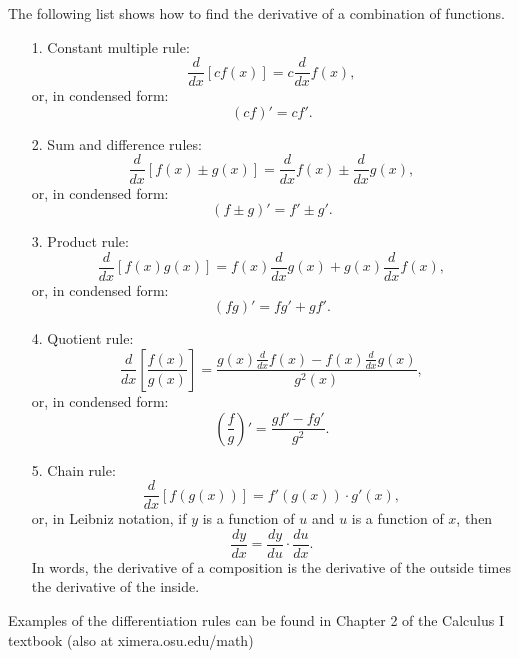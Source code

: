 \documentclass[handout]{ximera}
\begin{document}
The following list shows how to find the derivative of a combination of functions.

\begin{enumerate}

\item[1.] Constant multiple rule:
\[
\frac{d}{dx} \left[cf(x)\right] = c \frac{d}{dx} f(x),
\]
or, in condensed form:
\[
(cf)' = cf'.
\]

\item[2.] Sum and difference rules:
\[
\frac{d}{dx} \left[f(x) \pm g(x)\right] = \frac{d}{dx} f(x) \pm \frac{d}{dx} g(x),
\]
or, in condensed form:
\[
(f \pm g)' = f' \pm g'.
\]

\item[3.] Product rule:
\[
\frac{d}{dx} \left[f(x)g(x)\right] = f(x) \frac{d}{dx} g(x) + g(x) \frac{d}{dx} f(x),
\]
or, in condensed form:
\[
(fg)' = fg' + gf'.
\]

\item[4.] Quotient rule:
\[
\frac{d}{dx} \left[\frac{f(x)}{g(x)}\right] = \frac{g(x) \frac{d}{dx} f(x) - f(x) \frac{d}{dx} g(x)}{g^2(x)},
\]
or, in condensed form:
\[
\left(\frac{f}{g}\right)' =  \frac{gf' - fg'}{g^2}.
\]

\item[5.] Chain rule:
\[
\frac{d}{dx} \left[f(g(x))\right] = f'(g(x)) \cdot g'(x),
\]
or, in Leibniz notation, if $y$ is a function of $u$ and $u$ is a function of $x$, then
\[
\frac{dy}{dx} = \frac{dy}{du} \cdot \frac{du}{dx}.
\]
In words, the derivative of a composition is the derivative of the outside times the derivative of the inside.

\end{enumerate}

Examples of the differentiation rules can be found in Chapter 2 of the 
Calculus I textbook (also at ximera.osu.edu/math)
\end{document}
